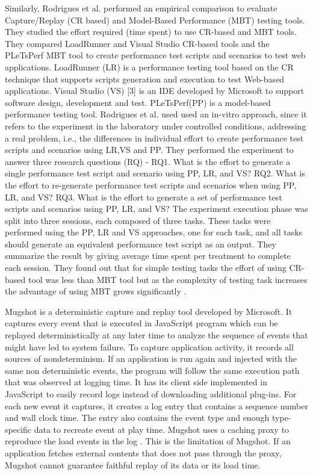 \documentclass[12pt,journal]{IEEEtran}
\begin{document}
Similarly, Rodrigues et al.\cite{paper2} performed an empirical comparison to evaluate Capture/Replay (CR based) and Model-Based Performance (MBT) testing tools. They studied the effort required (time spent) to use CR-based and MBT tools. They compared LoadRunner and Visual Studio CR-based tools and the PLeTsPerf MBT tool to create performance test scripts and scenarios to test web applications. LoadRunner (LR) is a performance testing tool based on the CR technique that supports scripts generation and execution to test Web-based applications. Visual Studio (VS) [3] is an IDE developed by Microsoft to support software design, development and test. PLeTsPerf(PP) is a model-based performance testing tool. Rodrigues et al. used used an in-vitro approach, since it refers to the experiment in the laboratory under controlled conditions, addressing a real problem, i.e., the differences in individual effort to create performance test scripts and scenarios using LR,VS and PP. They performed the experiment to answer three research questions (RQ) - RQ1. What is the effort to generate a single performance test script and scenario using PP, LR, and VS? RQ2. What is the effort to re-generate performance test scripts and scenarios when using PP, LR, and VS? RQ3. What is the effort to generate a set of performance test scripts and scenarios using PP, LR, and VS? The experiment execution phase was split into three sessions, each composed of three tasks. These tasks were performed using the PP, LR  and VS approaches, one for each task, and all tasks should generate an equivalent performance test script as an output. They summarize the result by giving average time spent per treatment to complete each session. They found out that for simple testing tasks the effort of using CR-based tool was less than MBT tool but as the complexity of testing task increases the advantage of using MBT grows significantly \cite{paper2}.

Mugshot\cite{paper4} is a deterministic capture and replay tool developed by Microsoft. It captures every event that is executed in JavaScript program which can be replayed deterministically at any later time to analyze the sequence of events that might have led to system failure. To capture application activity, it records all sources of nondeterminism. If an application is run again and injected with the same non deterministic events, the program will follow the same execution path that was observed at logging time. It has its client side implemented in JavaScript to easily record logs instead of downloading additional plug-ins. For each new event it captures, it creates a log entry that contains a sequence number and wall clock time. The entry also contains the event type and enough type-specific data to recreate event at play time. Mugshot uses a caching proxy to reproduce the load events in the log \cite{paper4}. This is the limitation of Mugshot. If an application fetches external contents that does not pass through the proxy, Mugshot cannot guarantee faithful replay of its data or its load time.
\end{document}
